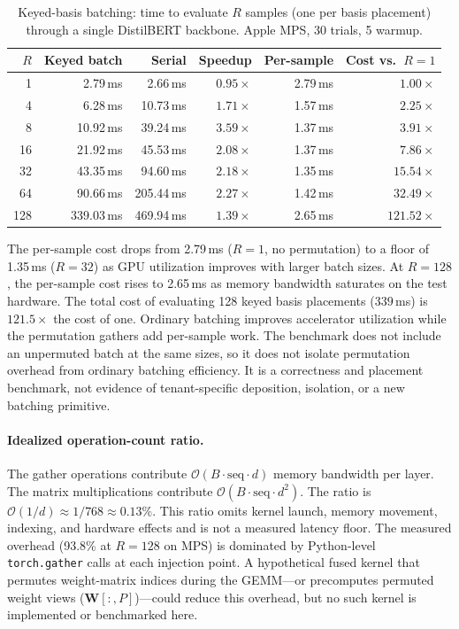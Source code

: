 \documentclass[11pt,a4paper]{article}
\newcommand{\bW}{\mathbf{W}}
\begin{document}
\begin{table}[ht]
\centering
\caption{Keyed-basis batching: time to evaluate $R$ samples
(one per basis placement) through a single DistilBERT backbone.
Apple MPS, 30 trials, 5 warmup.}
\label{tab:mux-scaling}
\begin{tabular}{@{}rrrrrr@{}}
\toprule
$R$ & Keyed batch & Serial & Speedup
& Per-sample & Cost vs.\ $R{=}1$ \\
\midrule
1 & 2.79\,ms & 2.66\,ms & $0.95\times$ & 2.79\,ms & $1.00\times$ \\
4 & 6.28\,ms & 10.73\,ms & $1.71\times$ & 1.57\,ms & $2.25\times$ \\
8 & 10.92\,ms & 39.24\,ms & $3.59\times$ & 1.37\,ms & $3.91\times$ \\
16 & 21.92\,ms & 45.53\,ms & $2.08\times$ & 1.37\,ms & $7.86\times$ \\
32 & 43.35\,ms & 94.60\,ms & $2.18\times$ & 1.35\,ms & $15.54\times$ \\
64 & 90.66\,ms & 205.44\,ms & $2.27\times$ & 1.42\,ms & $32.49\times$ \\
128 & 339.03\,ms & 469.94\,ms & $1.39\times$ & 2.65\,ms & $121.52\times$ \\
\bottomrule
\end{tabular}
\end{table}

The per-sample cost drops from 2.79\,ms ($R{=}1$, no permutation)
to a floor of 1.35\,ms ($R{=}32$) as GPU utilization improves with
larger batch sizes.  At $R{=}128$, the per-sample cost rises to
2.65\,ms as memory bandwidth saturates on the test hardware.  The
total cost of evaluating 128 keyed basis placements ($339$\,ms) is
$121.5\times$ the cost of one.  Ordinary batching improves
accelerator utilization while the permutation gathers add per-sample
work.  The benchmark does not include an unpermuted batch at the same
sizes, so it does not isolate permutation overhead from ordinary
batching efficiency.  It is a correctness and placement benchmark,
not evidence of tenant-specific deposition, isolation, or a new
batching primitive.

\paragraph{Idealized operation-count ratio.}
The gather operations contribute $\mathcal{O}(B \cdot
\mathrm{seq} \cdot d)$ memory bandwidth per layer.  The matrix
multiplications contribute $\mathcal{O}(B \cdot \mathrm{seq}
\cdot d^2)$.  The ratio is $\mathcal{O}(1/d) \approx 1/768
\approx 0.13\%$.  This ratio omits kernel launch, memory movement,
indexing, and hardware effects and is not a measured latency floor.
The measured overhead (93.8\% at $R{=}128$
on MPS) is dominated by Python-level \texttt{torch.gather}
calls at each injection point.  A hypothetical fused kernel that
permutes weight-matrix indices during the GEMM---or
precomputes permuted weight views ($\bW[:,P]$)---could reduce this
overhead, but no such kernel is implemented or benchmarked here.
\end{document}
